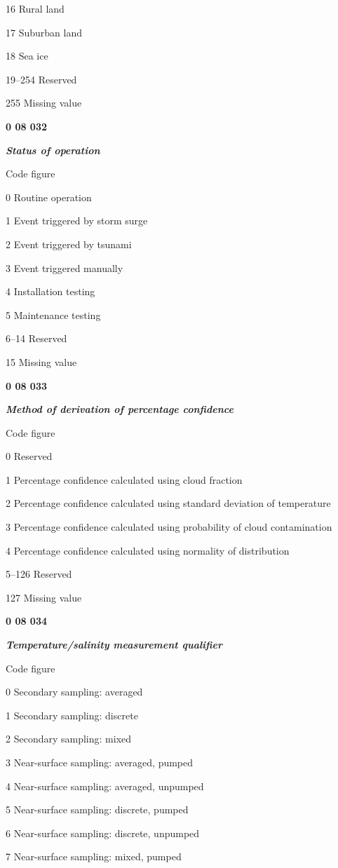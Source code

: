 16 Rural land

17 Suburban land

18 Sea ice

19--254 Reserved

255 Missing value

\textbf{0 08 032}

\emph{\textbf{Status of operation}}

Code figure

0 Routine operation

1 Event triggered by storm surge

2 Event triggered by tsunami

3 Event triggered manually

4 Installation testing

5 Maintenance testing

6--14 Reserved

15 Missing value

\textbf{0 08 033}

\emph{\textbf{Method of derivation of percentage confidence}}

Code figure

0 Reserved

1 Percentage confidence calculated using cloud fraction

2 Percentage confidence calculated using standard deviation of temperature

3 Percentage confidence calculated using probability of cloud contamination

4 Percentage confidence calculated using normality of distribution

5--126 Reserved

127 Missing value

\textbf{0 08 034}

\emph{\textbf{Temperature/salinity measurement qualifier}}

Code figure

0 Secondary sampling: averaged

1 Secondary sampling: discrete

2 Secondary sampling: mixed

3 Near-surface sampling: averaged, pumped

4 Near-surface sampling: averaged, unpumped

5 Near-surface sampling: discrete, pumped

6 Near-surface sampling: discrete, unpumped

7 Near-surface sampling: mixed, pumped


